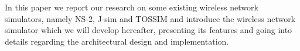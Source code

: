 In this paper we report our research on some existing wireless network
simulators, namely NS-2, J-sim and TOSSIM and introduce \codename the 
wireless network simulator which we will develop hereafter, presenting its 
features and going into details regarding the architectural design and implementation.

